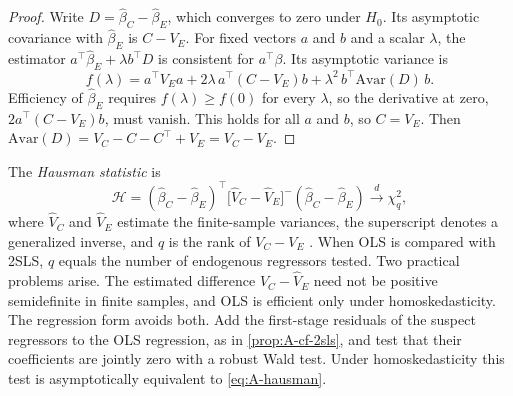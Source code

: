 \begin{proof}
Write $D = \hat\beta_C - \hat\beta_E$, which converges to zero under $H_0$. Its asymptotic covariance with
$\hat\beta_E$ is $C - V_E$. For fixed vectors $a$ and $b$ and a scalar $\lambda$, the estimator
$a^\top\hat\beta_E + \lambda b^\top D$ is consistent for $a^\top\beta$. Its asymptotic variance is
\begin{equation*}
f(\lambda) = a^\top V_Ea + 2\lambda\,a^\top(C - V_E)b + \lambda^2\,b^\top\mathrm{Avar}(D)\,b .
\end{equation*}
Efficiency of $\hat\beta_E$ requires $f(\lambda) \ge f(0)$ for every $\lambda$, so the derivative at zero,
$2a^\top(C - V_E)b$, must vanish. This holds for all $a$ and $b$, so $C = V_E$. Then
$\mathrm{Avar}(D) = V_C - C - C^\top + V_E = V_C - V_E$.
\end{proof}

The \emph{Hausman statistic} is
\begin{equation}\label{eq:A-hausman}
\mathcal{H} = (\hat\beta_C - \hat\beta_E)^\top\bigl[\hat V_C - \hat V_E\bigr]^{-}(\hat\beta_C - \hat\beta_E)
\xrightarrow{d} \chi^2_q ,
\end{equation}
where $\hat V_C$ and $\hat V_E$ estimate the finite-sample variances, the superscript denotes a generalized
inverse, and $q$ is the rank of $V_C - V_E$ \citep{Hausman1978}. When OLS is compared with 2SLS, $q$ equals the
number of endogenous regressors tested. Two practical problems arise. The estimated difference
$\hat V_C - \hat V_E$ need not be positive semidefinite in finite samples, and OLS is efficient only under
homoskedasticity. The regression form avoids both. Add the first-stage residuals of the suspect regressors to
the OLS regression, as in \cref{prop:A-cf-2sls}, and test that their coefficients are jointly zero with a
robust Wald test. Under homoskedasticity this test is asymptotically equivalent to \eqref{eq:A-hausman}.

